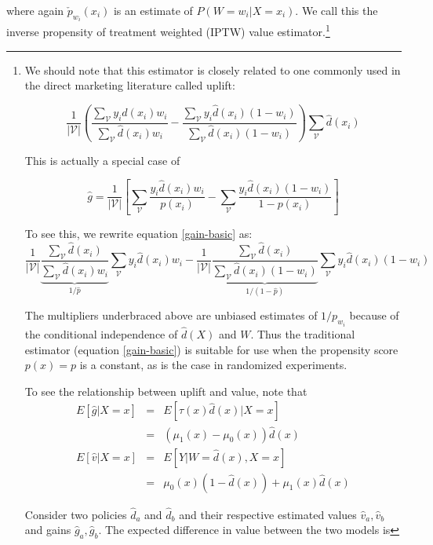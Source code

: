 where again $\check p_{w_i}(x_i)$ is an estimate of $P(W=w_i | X=x_i)$.  We call this the inverse propensity of treatment weighted (IPTW) value estimator.\footnote{
We should note that this estimator is closely related to one commonly used in the direct marketing literature called uplift:

\begin{equation}
\label{gain-basic}
	\frac{1}{|\mathcal V |} \left(
		  \frac{\sum_{\mathcal{V}} y_i  \hat d(x_i) w_i}{\sum_{\mathcal{V}}  \hat d(x_i) w_i} - 
		  \frac{\sum_{\mathcal{V}} y_i  \hat d(x_i) (1-w_i)}{\sum_{\mathcal{V}}  \hat d(x_i)  (1-w_i)} 
		  \right)
		  \sum_{\mathcal{V}} \hat d(x_i) 
\end{equation}

This is actually a special case of

\begin{equation}
\label{gain}
	\hat g  = \dfrac{1}{|\mathcal V |} \left[ \sum_{\mathcal{V}} \dfrac{y_i  \hat d(x_i) w_i}{p(x_i)} - \sum_{\mathcal{V}} \dfrac{y_i  \hat d(x_i) (1-w_i)}{1-p(x_i)} \right]
\end{equation}

To see this, we rewrite equation \ref{gain-basic} as:
\[
	 \dfrac{1}{|\mathcal V |} \underbrace{ \frac{ \sum_{\mathcal{V}} \hat d(x_i)}{\sum_{\mathcal{V}}  \hat d(x_i) w_i} }_{1/\hat p}
		  	\sum_{\mathcal{V}} y_i  \hat d(x_i) w_i - 
		\dfrac{1}{|\mathcal V |}  \underbrace{ \frac{ \sum_{\mathcal{V}} \hat d(x_i)}{\sum_{\mathcal{V}}  \hat d(x_i)  (1-w_i)} }_{1/ (1-\hat p)}
		  	\sum_{\mathcal{V}} y_i  \hat d(x_i) (1-w_i) 
\]

The multipliers underbraced above are unbiased estimates of $1/ p_{w_i}$ because of the conditional independence of $\hat d(X)$ and $W$. Thus the traditional estimator (equation \ref{gain-basic}) is suitable for use when the propensity score $p(x) = p$ is a constant, as is the case in randomized experiments.

To see the relationship between uplift and value, note that
\[
\begin{array}{rcl}	
	E[\hat g | X=x] & = & E[\tau(x) \hat d(x) | X=x]  \\
	& =  & (\mu_1(x)-\mu_0(x))  \hat d(x)  \\
	E[\hat v | X=x] & = & E[Y | W=\hat d(x), X=x]  \\
	& = & \mu_0(x)(1-\hat d(x)) + \mu_1(x)\hat d(x)
\end{array}
\]

Consider two policies $\hat d_a$ and $\hat d_b$ and their respective estimated values $\hat v_a, \hat v_b$  and gains $\hat g_a, \hat g_b$. The expected difference in value between the two models is 

}
